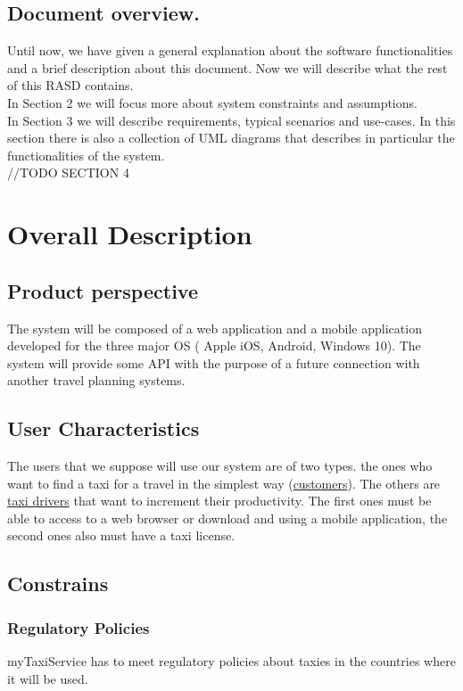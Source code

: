 \documentclass{report}
\begin{document}
	\section{Document overview.}
	Until now, we have given a general explanation about the software functionalities and a brief description about this document. Now we will describe what the rest of this RASD contains.\\
	In Section 2 we will focus more about system constraints and assumptions.\\
	In Section 3 we will describe requirements, typical scenarios and use-cases. In this section there is also a collection of UML diagrams that describes in particular the functionalities of the system.\\
	//TODO SECTION 4
		
\chapter{Overall Description}
	
	\section{Product perspective}
	The system will be composed of a web application and a mobile application developed for the three major OS ( Apple iOS, Android, Windows 10). The system will provide some API with the purpose of a future connection with another travel planning systems. 
		
	\section{User Characteristics}
	The users that we suppose will use our system are of two types. the ones who want to find a taxi for a travel in the simplest way (\hyperref[sec:customer]{customers}). The others are \hyperref[sec:tdriver]{taxi drivers} that want to increment their productivity. The first ones must be able to access to a web browser or download and using a mobile application, the second ones also must have a taxi license.
		
	\section{Constrains}
		
		\subsection{Regulatory Policies}
		myTaxiService  has to meet regulatory policies about taxies in the countries where it will be used.
\end{document}
